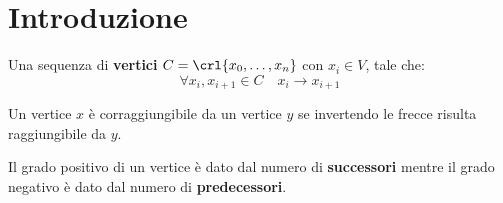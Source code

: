 \documentclass[\main/main.tex]{subfiles}
\begin{document}
\chapter{Introduzione}
\begin{definition}
  Una sequenza di \textbf{vertici} \(C = \crl{x_0, \ldots, x_n}\) con \(x_i \in V\), tale che:
  \[
    \forall x_i, x_{i+1} \in C \quad x_i \rightarrow x_{i+1}
  \]
\end{definition}
\begin{definition}
  Un vertice \(x\) è corraggiungibile da un vertice \(y\) se invertendo le frecce risulta raggiungibile da \(y\).
\end{definition}
\begin{definition}
  Il grado positivo di un vertice è dato dal numero di \textbf{successori} mentre il grado negativo è dato dal numero di \textbf{predecessori}.
\end{definition}
\end{document}
